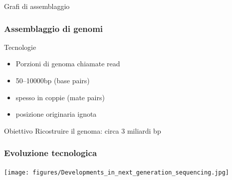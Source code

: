 



\begin{frame}
      \titlepage

        \centering
          Grafi di assemblaggio
\end{frame}


\begin{frame}[fragile]
\frametitle{Assemblaggio di genomi}
\begin{block}{Tecnologie}
\begin{itemize}
\item
Porzioni di genoma chiamate \alert{read}
\item
50--10000bp (base pairs)
\item
spesso in coppie (\alert{mate pairs})
\item
posizione originaria ignota
\end{itemize}
\end{block}

\begin{block}{Obiettivo}
Ricostruire il genoma: circa 3 miliardi bp
\end{block}
\end{frame}

\begin{frame}[fragile]
\frametitle{Evoluzione tecnologica}
\texttt{[image: figures/Developments\_in\_next\_generation\_sequencing.jpg]}
\end{frame}

